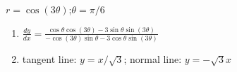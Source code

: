 {$r=\cos(3\theta)$;\quad $\theta = \pi/6$}
{\begin{enumerate}
	\item $\frac{dy}{dx} = \frac{\cos\theta\cos(3\theta)-3\sin\theta\sin(3\theta)}{-\cos(3\theta)\sin\theta-3\cos\theta\sin(3\theta)}$
	\item	tangent line: $y=x/\sqrt{3}$; normal line: $y=-\sqrt{3}x$
\end{enumerate}}
